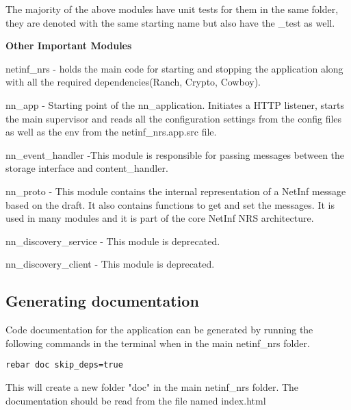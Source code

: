 The majority of the above modules have unit tests for them in the same folder, they are denoted with the same starting name but also have the \_test as well. 

\textbf{Other Important Modules}

netinf\_nrs - holds the main code for starting and stopping the application along with all the required dependencies(Ranch, Crypto, Cowboy).

nn\_app - Starting point of the nn\_application. Initiates a HTTP listener, starts the main supervisor and reads all the configuration settings from the config files as well as the env from the netinf\_nrs.app.src file.

nn\_event\_handler -This module is responsible for passing messages between the storage interface and content\_handler. 

nn\_proto - This module contains the internal representation of a NetInf message based on the draft. It also contains functions to get and set the messages. It is used in many modules and it is part of the core NetInf NRS architecture.

nn\_discovery\_service - This module is deprecated.

nn\_discovery\_client - This module is deprecated.


\subsection{Generating documentation}
\label{bdoc}
Code documentation for the application can be generated by running the following commands in the terminal when in the main netinf\_nrs folder.

\begin{verbatim}
rebar doc skip_deps=true
\end{verbatim}

This will create a new folder "doc" in the main netinf\_nrs folder. The documentation should be read from the file named index.html



